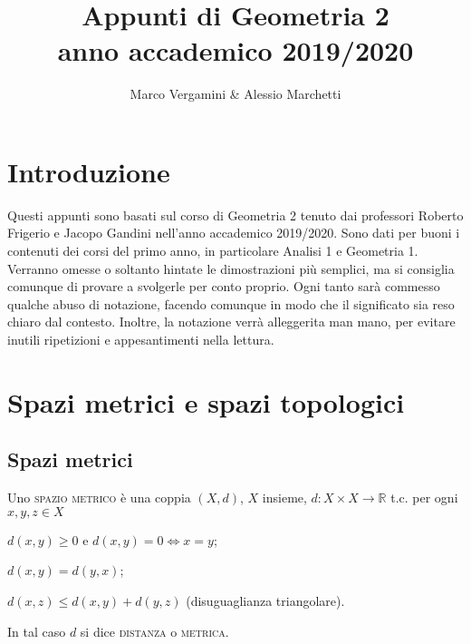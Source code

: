 \documentclass{article}
\title{Appunti di Geometria 2 \\ anno accademico 2019/2020}
\date{}
\author{Marco Vergamini \& Alessio Marchetti}
\begin{document}
\maketitle
\newpage
\tableofcontents
\newpage

\section{Introduzione}
Questi appunti sono basati sul corso di Geometria 2 tenuto dai professori
Roberto Frigerio e Jacopo Gandini nell'anno accademico 2019/2020. Sono dati per
buoni i contenuti dei corsi del primo anno, in particolare Analisi 1 e Geometria
1. Verranno omesse o soltanto hintate le dimostrazioni più semplici, ma si
consiglia comunque di provare a svolgerle per conto proprio. Ogni tanto sarà
commesso qualche abuso di notazione, facendo comunque in modo che il significato
sia reso chiaro dal contesto. Inoltre, la notazione verrà alleggerita man mano,
per evitare inutili ripetizioni e appesantimenti nella lettura.

\section{Spazi metrici e spazi topologici}
\subsection{Spazi metrici}
\begin{defn}
	Uno \textsc{spazio metrico} è una coppia $(X, d)$, $X$ insieme,
	${d: X \times X \rightarrow \mathbb{R}}$ t.c. per ogni ${x, y, z \in X}$
    \begin{nlist}
	\item $d(x, y) \ge 0$ e $d(x, y)=0 \Leftrightarrow x=y$;
	\item $d(x, y)=d(y, x)$;
	\item $d(x, z) \le d(x, y)+d(y,z)$ (disuguaglianza triangolare).
    \end{nlist}
	In tal caso $d$ si dice \textsc{distanza} o \textsc{metrica}.
\end{defn}
\end{document}
